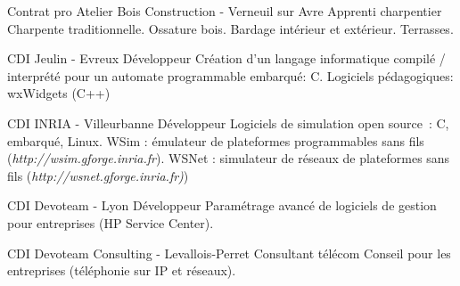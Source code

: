 \documentclass[10pt]{article} %
\begin{document}
\begin{paracol}{2}
  {Contrat pro} %
  {Atelier Bois Construction {\small- Verneuil sur Avre}} %
  {Apprenti charpentier} %
  {Charpente traditionnelle. Ossature bois. Bardage intérieur et extérieur. Terrasses.}  %


  {CDI} %
  {Jeulin {\small- Evreux}} %
  {Développeur} %
  {Création d'un langage informatique compilé / interprété pour un automate programmable embarqué: C. Logiciels pédagogiques: wxWidgets (C++)} %

  {CDI} %
  {INRIA {\small- Villeurbanne}} %
  {Développeur} %
  {Logiciels de simulation open source : C, embarqué, Linux. WSim : émulateur de plateformes programmables sans fils {\small(\textit{http://wsim.gforge.inria.fr})}. WSNet : simulateur de réseaux de plateformes sans fils {\small(\textit{http://wsnet.gforge.inria.fr)})}} %

  {CDI} %
  {Devoteam {\small- Lyon}} %
  {Développeur} %
  {Paramétrage avancé de logiciels de gestion pour entreprises (HP Service Center).} %

  {CDI} %
  {Devoteam Consulting {\small- Levallois-Perret}} %
  {Consultant télécom} %
  {Conseil pour les entreprises (téléphonie sur IP et réseaux).} %


  \vspace{-\baselineskip}\medskip %

  \switchcolumn %



\end{paracol}
\end{document}
